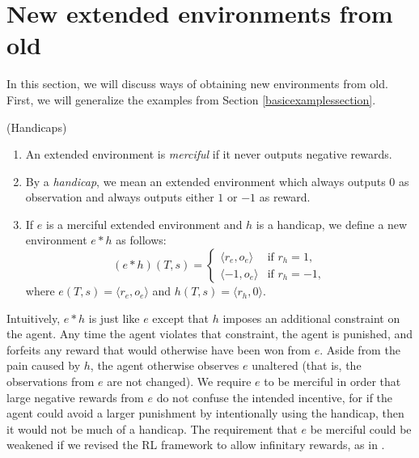 \documentclass[runningheads]{llncs}
\begin{document}
\section{New extended environments from old}
\label{newextendedenvironmentsfromoldsecn}

In this section, we will discuss ways of obtaining new environments from old.
First, we will generalize the examples from Section \ref{basicexamplessection}.

\begin{definition}
    (Handicaps)
    \begin{enumerate}
        \item
        An extended environment is \emph{merciful} if it never outputs negative rewards.
        \item
        By a \emph{handicap}, we mean an extended environment which always outputs $0$ as
        observation and always outputs either $1$ or $-1$ as reward.
        \item
        If $e$ is a merciful extended environment and $h$ is a handicap,
        we define a new environment $e*h$ as follows:
        \[
            (e*h)(T,s) =
            \begin{cases}
                \langle r_e, o_e\rangle &\mbox{if $r_h=1$},\\
                \langle -1, o_e\rangle &\mbox{if $r_h=-1$},
            \end{cases}
        \]
        where $e(T,s)=\langle r_e,o_e\rangle$ and $h(T,s)=\langle r_h,0\rangle$.
    \end{enumerate}
\end{definition}

Intuitively, $e*h$ is just like $e$ except that $h$ imposes an additional constraint
on the agent. Any time the agent violates that constraint, the agent is punished,
and forfeits any reward that would otherwise have been won from $e$. Aside from the
pain caused by $h$, the agent otherwise observes $e$ unaltered (that is, the observations
from $e$ are not changed). We require $e$ to be merciful in order that large negative
rewards from $e$ do not confuse the intended incentive, for if the agent could avoid
a larger punishment by intentionally using the handicap, then it would not
be much of a handicap. The requirement that $e$ be
merciful could be weakened if we revised the RL framework
to allow infinitary rewards, as in \cite{alexander2020archimedean}.
\end{document}
